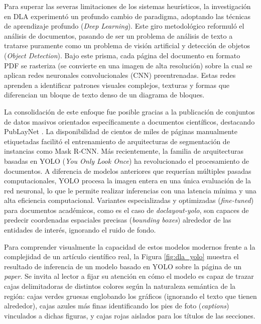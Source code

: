 \documentclass[a4paper]{report}
\begin{document}
Para superar las severas limitaciones de los sistemas heurísticos, la investigación en DLA experimentó un profundo cambio de paradigma, adoptando las técnicas de aprendizaje profundo (\textit{Deep Learning}). Este giro metodológico reformuló el análisis de documentos, pasando de ser un problema de análisis de texto a tratarse puramente como un problema de visión artificial y detección de objetos (\textit{Object Detection}). Bajo este prisma, cada página del documento en formato PDF se rasteriza (se convierte en una imagen de alta resolución) sobre la cual se aplican redes neuronales convolucionales (CNN) preentrenadas. Estas redes aprenden a identificar patrones visuales complejos, texturas y formas que diferencian un bloque de texto denso de un diagrama de bloques.

La consolidación de este enfoque fue posible gracias a la publicación de conjuntos de datos masivos orientados específicamente a documentos científicos, destacando PubLayNet \cite{zhong2019publaynet}. La disponibilidad de cientos de miles de páginas manualmente etiquetadas facilitó el entrenamiento de arquitecturas de segmentación de instancias como Mask R-CNN. Más recientemente, la familia de arquitecturas basadas en YOLO (\textit{You Only Look Once}) ha revolucionado el procesamiento de documentos. A diferencia de modelos anteriores que requerían múltiples pasadas computacionales, YOLO procesa la imagen entera en una única evaluación de la red neuronal, lo que le permite realizar inferencias con una latencia mínima y una alta eficiencia computacional. Variantes especializadas y optimizadas (\textit{fine-tuned}) para documentos académicos, como es el caso de \textit{doclayout-yolo}, son capaces de predecir coordenadas espaciales precisas (\textit{bounding boxes}) alrededor de las entidades de interés, ignorando el ruido de fondo.

Para comprender visualmente la capacidad de estos modelos modernos frente a la complejidad de un artículo científico real, la Figura \ref{fig:dla_yolo} muestra el resultado de inferencia de un modelo basado en YOLO sobre la página de un \textit{paper}. Se invita al lector a fijar su atención en cómo el modelo es capaz de trazar cajas delimitadoras de distintos colores según la naturaleza semántica de la región: cajas verdes gruesas englobando los gráficos (ignorando el texto que tienen alrededor), cajas azules más finas identificando los pies de foto (\textit{captions}) vinculados a dichas figuras, y cajas rojas aislados para los títulos de las secciones.
\end{document}

